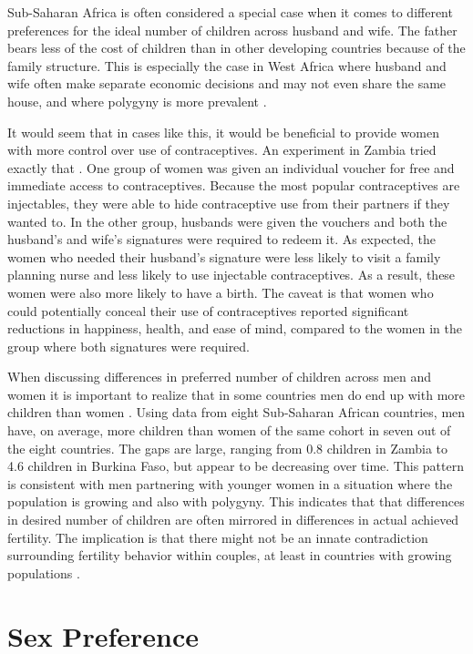 Sub-Saharan Africa is often considered a special case when it comes to different preferences for the ideal number of children across husband and wife. The father bears less of the cost of children than in other developing countries because of the family structure. This is especially the case in West Africa where husband and wife often make separate economic decisions and may not even share the same house, and where polygyny is more prevalent \citep{Caldwell1992,Udry1996,Tertilt2005}.

It would seem that in cases like this, it would be beneficial to provide women with more control over use of contraceptives. An experiment in Zambia tried exactly that \citep{Ashraf2014}. One group of women was given an individual voucher for free and immediate access to contraceptives. Because the most popular contraceptives are injectables, they were able to hide contraceptive use from their partners if they wanted to. In the other group, husbands were given the vouchers and both the husband's and wife's signatures were required to redeem it. As expected, the women who needed their husband's signature were less likely to visit a family planning nurse and less likely to use injectable contraceptives. As a result, these women were also more likely to have a birth. The caveat is that women who could potentially conceal their use of contraceptives reported significant reductions in happiness, health, and ease of mind, compared to the women in the group where both signatures were required.

When discussing differences in preferred number of children across men and women it is important to realize that in some countries men do end up with more children than women \citep{Field2016}. Using data from eight Sub-Saharan African countries, men have, on average, more children than women of the same cohort in seven out of the eight countries. The gaps are large, ranging from 0.8 children in Zambia to 4.6 children in Burkina Faso, but appear to be decreasing over time. This pattern is consistent with men partnering with younger women in a situation where the population is growing and also with polygyny. This indicates that that differences in desired number of children are often mirrored in differences in actual achieved fertility. The implication is that there might not be an innate contradiction surrounding fertility behavior within couples, at least in countries with growing populations \citep{Field2016}.

\section{Sex Preference}\label{sex-preference}


